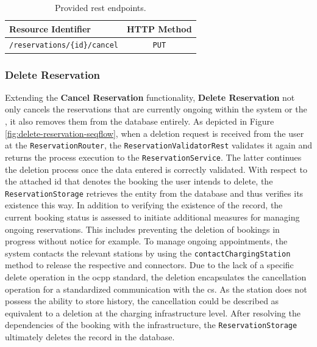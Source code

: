 \begingroup
\setlength{\tabcolsep}{10pt} %
\renewcommand{\arraystretch}{1.5} %
\begin{table}[h]
\centering
\caption{Provided \acrshort{rest} endpoints.}
    \begin{tabular}{l|c}
    Resource Identifier & HTTP Method \\ \hline
    \texttt{/reservations/\{id\}/cancel} & \texttt{PUT}
    \end{tabular}
\label{tab:cancel-reservation-rest}
\end{table}
\endgroup

\newpage

\subsubsection{Delete Reservation}
\label{ch:Implementation:sec:Reservation System:ssec:Management Capabilities:sssec:Delete Reservation}

Extending the \textbf{Cancel Reservation} functionality, \textbf{Delete Reservation} not only cancels the reservations that are currently ongoing within the system or the , it also removes them from the database entirely.
As depicted in Figure \ref{fig:delete-reservation-seqflow}, when a deletion request is received from the user at the \texttt{ReservationRouter}, the \texttt{ReservationValidatorRest} validates it again and returns the process execution to the \texttt{ReservationService}. The latter continues the deletion process once the data entered is correctly validated.
With respect to the attached \acrshort{id} that denotes the booking the user intends to delete, the \texttt{ReservationStorage} retrieves the entity from the database and thus verifies its existence this way.
In addition to verifying the existence of the record, the current booking status is assessed to initiate additional measures for managing ongoing reservations.
This includes preventing the deletion of bookings in progress without notice for example. To manage ongoing appointments, the system contacts the relevant stations by using the \texttt{contactChargingStation} method to release the respective  and connectors.
Due to the lack of a specific delete operation in the \acrshort{ocpp} standard, the deletion encapsulates the cancellation operation for a standardized communication with the \acrshort{cs}. 
As the station does not possess the ability to store history, the cancellation could be described as equivalent to a deletion at the charging infrastructure level.
After resolving the dependencies of the booking with the infrastructure, the \texttt{ReservationStorage} ultimately deletes the record in the database.


